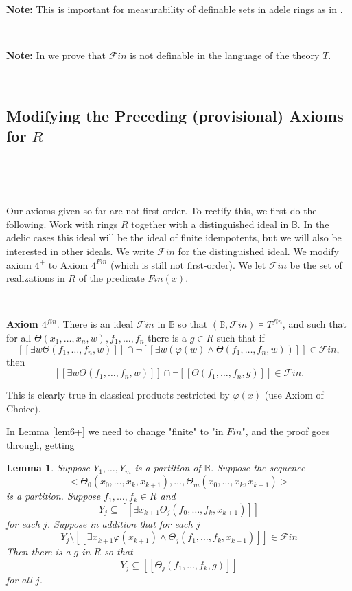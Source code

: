 \documentclass[12pt]{amsart}
\def\B{\mathbb{B}}
\newtheorem{lemma}{Lemma}[section]
\numberwithin{equation}{section}
\begin{document}
{\bf Note:} This is important for measurability of definable sets in adele rings as in \cite{DM-ad}.

\

{\bf Note:} In \cite{DM-bool} we prove that $\mathcal{F}in$ is not definable in the language of the theory $T$.

\

\subsection{Modifying the Preceding (provisional) Axioms for $R$}

\

\

Our axioms given so far are not first-order. To rectify this, we first do the following. 
Work with rings $R$ together with a distinguished ideal in $\B$. In the adelic cases this ideal will be the ideal of finite idempotents, 
but we will also be interested in other ideals. We write $\mathcal{F}in$ for the distinguished ideal. We modify axiom $4^+$ to Axiom $4^{Fin}$ (which is still not first-order). 
We let $\mathcal{F}in$ be the set of realizations in $R$ of the predicate $Fin(x)$.


\

{\bf Axiom $4^{fin}$}. There is an ideal $\mathcal{F}in$ in $\B$ so that $(\B,\mathcal{F}in)\models T^{fin}$, and such that for all  
$\Theta(x_1,\dots,x_n,w), f_1,\dots,f_n$ there is a $g\in R$ such that if 
$$[[\exists w \Theta(f_1,\dots,f_n,w)]]  \cap \neg [[\exists w (\varphi(w) \wedge \Theta(f_1,\dots,f_n,w))]]\in \mathcal{F}in,$$
then
$$[[\exists w \Theta(f_1,\dots,f_n,w)]]\cap \neg [[\Theta(f_1,\dots,f_n,g)]]\in \mathcal{F}in.$$

This is clearly true in classical products restricted by $\varphi(x)$ (use Axiom of Choice).

In Lemma \ref{lem6+} we need to change "finite" to "in $Fin$", and the proof goes through, getting

\begin{lemma}\label{lem6fin} Suppose $Y_1,\dots,Y_m$ is a partition of $\B$. 
Suppose the sequence
$$<\Theta_0(x_0,\dots,x_k,x_{k+1}),\dots,\Theta_m(x_0,\dots,x_k,x_{k+1})>$$ 
is a partition. Suppose $f_1,\dots,f_k\in R$ and 
$$Y_j\subseteq [[\exists x_{k+1} \Theta_j(f_0,\dots,f_k,x_{k+1})]]$$
for each $j$. Suppose in addition that for each $j$
$$Y_j\setminus [[\exists x_{k+1} \varphi(x_{k+1}) \wedge \Theta_j(f_1,\dots,f_k,x_{k+1})]] \in \mathcal{F}in$$
Then there is a $g$ in $R$ so that
$$Y_j\subseteq [[\Theta_j(f_1,\dots,f_k,g)]]$$
for all $j$.\end{lemma}
\end{document}
